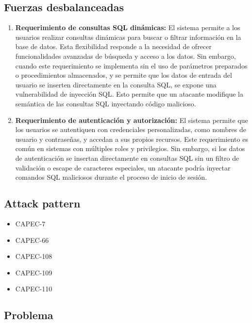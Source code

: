 \subsection*{Fuerzas desbalanceadas}

\begin{enumerate}
    \item \textbf{Requerimiento de consultas SQL dinámicas: }El sistema permite a los usuarios realizar consultas dinámicas para buscar o filtrar información en la base de datos. Esta flexibilidad responde a la necesidad de ofrecer funcionalidades avanzadas de búsqueda y acceso a los datos. Sin embargo, cuando este requerimiento se implementa sin el uso de parámetros preparados o procedimientos almacenados, y se permite que los datos de entrada del usuario se inserten directamente en la consulta SQL, se expone una vulnerabilidad de inyección SQL. Esto permite que un atacante modifique la semántica de las consultas SQL inyectando código malicioso.
    \item \textbf{Requerimiento de autenticación y autorización:} El sistema permite que los usuarios se autentiquen con credenciales personalizadas, como nombres de usuario y contraseñas, y accedan a sus propios recursos. Este requerimiento es común en sistemas con múltiples roles y privilegios. Sin embargo, si los datos de autenticación se insertan directamente en consultas SQL sin un filtro de validación o escape de caracteres especiales, un atacante podría inyectar comandos SQL maliciosos durante el proceso de inicio de sesión.
\end{enumerate}

\subsection*{Attack pattern}

\begin{itemize}
    \item CAPEC-7
    \item CAPEC-66
    \item CAPEC-108
    \item CAPEC-109
    \item CAPEC-110 
\end{itemize}

\subsection*{Problema}

